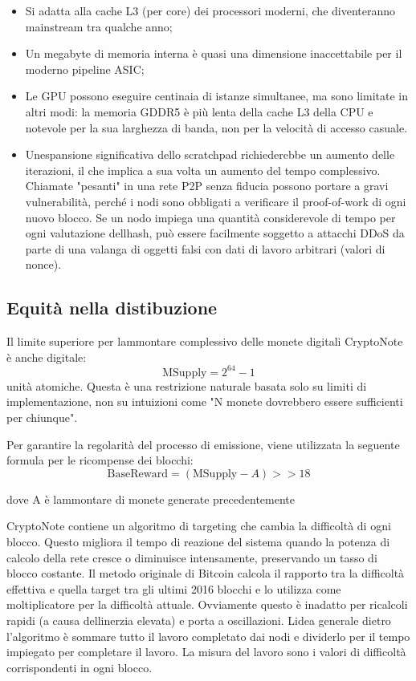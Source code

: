 \begin{itemize}
\item
  Si adatta alla cache L3 (per core) dei processori moderni, che
  diventeranno mainstream tra qualche anno;
\item
  Un megabyte di memoria interna è quasi una dimensione inaccettabile
  per il moderno pipeline ASIC;
\item
  Le GPU possono eseguire centinaia di istanze simultanee, ma sono
  limitate in altri modi: la memoria GDDR5 è più lenta della cache L3
  della CPU e notevole per la sua larghezza di banda, non per la
  velocità di accesso casuale.
\item
  Un\textquotesingle espansione significativa dello scratchpad
  richiederebbe un aumento delle iterazioni, il che implica a sua volta
  un aumento del tempo complessivo. Chiamate "pesanti" in una rete P2P
  senza fiducia possono portare a gravi vulnerabilità, perché i nodi
  sono obbligati a verificare il proof-of-work di ogni nuovo blocco. Se
  un nodo impiega una quantità considerevole di tempo per ogni
  valutazione dell\textquotesingle hash, può essere facilmente soggetto
  a attacchi DDoS da parte di una valanga di oggetti falsi con dati di
  lavoro arbitrari (valori di nonce).
\end{itemize}

\subsection{Equità nella
distibuzione}\label{equituxe0-nella-distibuzione}

Il limite superiore per l\textquotesingle ammontare complessivo delle
monete digitali CryptoNote è anche digitale:
\[\text{MSupply} = 2^{64} - 1\] unità atomiche. Questa è una restrizione
naturale basata solo su limiti di implementazione, non su intuizioni
come "N monete dovrebbero essere sufficienti per chiunque".

Per garantire la regolarità del processo di emissione, viene utilizzata
la seguente formula per le ricompense dei blocchi: \[
\text{BaseReward} = (\text{MSupply} - A) >> 18 \]

dove A è l\textquotesingle ammontare di monete generate precedentemente

CryptoNote contiene un algoritmo di targeting che cambia la difficoltà
di ogni blocco. Questo migliora il tempo di reazione del sistema quando
la potenza di calcolo della rete cresce o diminuisce intensamente,
preservando un tasso di blocco costante. Il metodo originale di Bitcoin
calcola il rapporto tra la difficoltà effettiva e quella target tra gli
ultimi 2016 blocchi e lo utilizza come moltiplicatore per la difficoltà
attuale. Ovviamente questo è inadatto per ricalcoli rapidi (a causa
dell\textquotesingle inerzia elevata) e porta a oscillazioni.
L\textquotesingle idea generale dietro l'algoritmo è sommare tutto il
lavoro completato dai nodi e dividerlo per il tempo impiegato per
completare il lavoro. La misura del lavoro sono i valori di difficoltà
corrispondenti in ogni blocco.

